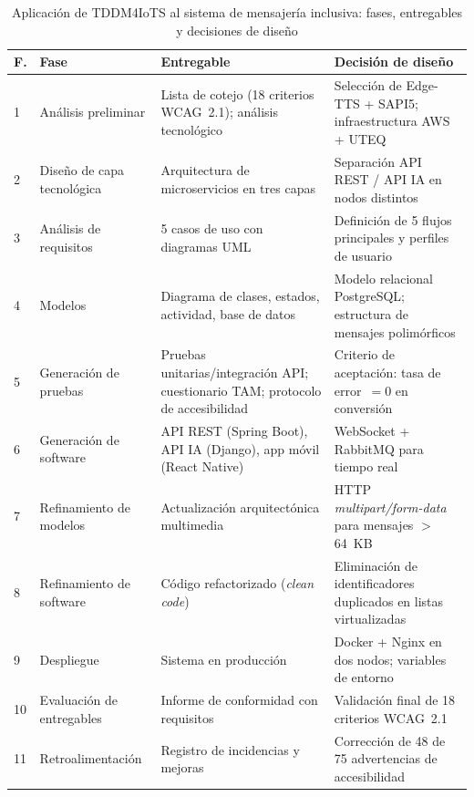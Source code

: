 \documentclass[journal]{IEEEtran}
\begin{document}
	\begin{table}[!t]
		\caption{Aplicaci\'on de TDDM4IoTS al sistema de mensajer\'ia inclusiva: fases, entregables y decisiones de dise\~no}
		\label{tab:fases_tddm4iots}
		\centering
		\renewcommand{\arraystretch}{1.25}
		\begin{tabular}{p{0.25cm}p{1.9cm}p{2.5cm}p{2.1cm}}
			\toprule
			\textbf{F.} & \textbf{Fase} & \textbf{Entregable} & \textbf{Decisi\'on de dise\~no} \\
			\midrule
			1 & An\'alisis preliminar & Lista de cotejo (18 criterios WCAG~2.1); an\'alisis tecnol\'ogico & Selecci\'on de Edge-TTS + SAPI5; infraestructura AWS + UTEQ \\
			2 & Dise\~no de capa tecnol\'ogica & Arquitectura de microservicios en tres capas & Separaci\'on API REST / API IA en nodos distintos \\
			3 & An\'alisis de requisitos & 5 casos de uso con diagramas UML & Definici\'on de 5 flujos principales y perfiles de usuario \\
			4 & Modelos & Diagrama de clases, estados, actividad, base de datos & Modelo relacional PostgreSQL; estructura de mensajes polim\'orficos \\
			5 & Generaci\'on de pruebas & Pruebas unitarias/integraci\'on API; cuestionario TAM; protocolo de accesibilidad & Criterio de aceptaci\'on: tasa de error~$= 0$ en conversi\'on \\
			6 & Generaci\'on de software & API REST (Spring Boot), API IA (Django), app m\'ovil (React Native) & WebSocket + RabbitMQ para tiempo real \\
			7 & Refinamiento de modelos & Actualizaci\'on arquitect\'onica multimedia & HTTP \textit{multipart/form-data} para mensajes $>$64~KB \\
			8 & Refinamiento de software & C\'odigo refactorizado (\textit{clean code}) & Eliminaci\'on de identificadores duplicados en listas virtualizadas \\
			9 & Despliegue & Sistema en producci\'on & Docker + Nginx en dos nodos; variables de entorno \\
			10 & Evaluaci\'on de entregables & Informe de conformidad con requisitos & Validaci\'on final de 18 criterios WCAG~2.1 \\
			11 & Retroalimentaci\'on & Registro de incidencias y mejoras & Correcci\'on de 48 de 75 advertencias de accesibilidad \\
			\bottomrule
		\end{tabular}
	\end{table}
	
\end{document}
